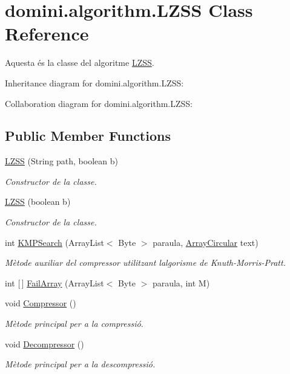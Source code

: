 \hypertarget{classdomini_1_1algorithm_1_1LZSS}{}\section{domini.\+algorithm.\+L\+Z\+SS Class Reference}
\label{classdomini_1_1algorithm_1_1LZSS}


Aquesta és la classe del algoritme \hyperlink{classdomini_1_1algorithm_1_1LZSS}{L\+Z\+SS}.  




Inheritance diagram for domini.\+algorithm.\+L\+Z\+SS\+:


Collaboration diagram for domini.\+algorithm.\+L\+Z\+SS\+:
\subsection*{Public Member Functions}
\begin{DoxyCompactItemize}
\item 
\hyperlink{classdomini_1_1algorithm_1_1LZSS_a8db81d23b97e401015ec60763ef13aba}{L\+Z\+SS} (String path, boolean b)
\begin{DoxyCompactList}\small\item\em Constructor de la classe. \end{DoxyCompactList}\item 
\hyperlink{classdomini_1_1algorithm_1_1LZSS_af1d7db47ad910e8bdeffb59c2f4f1caa}{L\+Z\+SS} (boolean b)
\begin{DoxyCompactList}\small\item\em Constructor de la classe. \end{DoxyCompactList}\item 
int \hyperlink{classdomini_1_1algorithm_1_1LZSS_a94b98f9eb4a4f60b9b773ecbf7fba276}{K\+M\+P\+Search} (Array\+List$<$ Byte $>$ paraula, \hyperlink{classdomini_1_1utils_1_1ArrayCircular}{Array\+Circular} text)
\begin{DoxyCompactList}\small\item\em Mètode auxiliar del compressor utilitzant l\textquotesingle{}algorisme de Knuth-\/\+Morris-\/\+Pratt. \end{DoxyCompactList}\item 
int \mbox{[}$\,$\mbox{]} \hyperlink{classdomini_1_1algorithm_1_1LZSS_a56733a42f84d7a58cc5db9ea5f67835f}{Fail\+Array} (Array\+List$<$ Byte $>$ paraula, int M)
\item 
void \hyperlink{classdomini_1_1algorithm_1_1LZSS_a047f2460b8461cdb044604dd639326a3}{Compressor} ()
\begin{DoxyCompactList}\small\item\em Mètode principal per a la compressió. \end{DoxyCompactList}\item 
void \hyperlink{classdomini_1_1algorithm_1_1LZSS_a665ab942951b839e63dc06e707bba1ad}{Decompressor} ()
\begin{DoxyCompactList}\small\item\em Mètode principal per a la descompressió. \end{DoxyCompactList}\end{DoxyCompactItemize}
